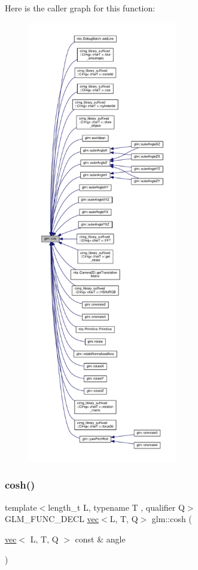 Here is the caller graph for this function\+:
\nopagebreak
\begin{figure}[H]
\begin{center}
\leavevmode
\includegraphics[height=550pt]{dc/d43/group__core__func__trigonometric_ga6a41efc740e3b3c937447d3a6284130e_icgraph}
\end{center}
\end{figure}
\mbox{\label{group__core__func__trigonometric_ga4e260e372742c5f517aca196cf1e62b3}} 
\subsubsection{\texorpdfstring{cosh()}{cosh()}}
{\footnotesize\ttfamily template$<$length\+\_\+t L, typename T , qualifier Q$>$ \\
G\+L\+M\+\_\+\+F\+U\+N\+C\+\_\+\+D\+E\+CL \hyperlink{structglm_1_1vec}{vec}$<$L, T, Q$>$ glm\+::cosh (\begin{DoxyParamCaption}\item[{\hyperlink{structglm_1_1vec}{vec}$<$ L, T, Q $>$ const \&}]{angle }\end{DoxyParamCaption})}



